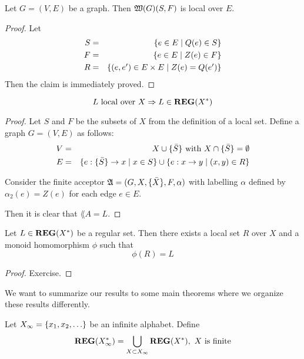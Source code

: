 \bigskip
\begin{lemma}
Let $G = (V, E)$ be a graph. Then $\mbox{$\mathfrak{W}({G})$}(S, F)$ is local over $E$.
\end{lemma}

\begin{proof}
Let \begin{eqnarray*}
S & = & \mbox{$\{e \in E \mid Q(e) \in S\}$} \\ 
F & = & \mbox{$\{e \in E \mid Z(e) \in F\}$} \\
R & = & \mbox{$\{(e, e') \in E \times E \mid Z(e) = Q(e')\}$} 
\end{eqnarray*}
Then the claim is immediately proved.
\end{proof}

\bigskip
\begin{lemma}
\[ L \mbox{ local over } X \Rightarrow L \in \mbox{{\bf REG}}(X^*) \]
\end{lemma}

\begin{proof}
Let $S$ and $F$ be the subsets of $X$ from the definition of a local
set. Define a graph $G = (V, E)$ as follows:
\begin{eqnarray*}
V & = & X \cup \mbox{$\{\bar{S}\}$} \mbox{ with } X \cap \mbox{$\{\bar{S}\}$} = \emptyset
\\
E & = & \mbox{$\{e : \mbox{$\{\bar{S}\}$} \to x \mid x \in S\}$} \cup \mbox{$\{e : x \to y
\mid (x, y) \in R\}$}
\end{eqnarray*}

Consider the finite acceptor $\mbox{$\mathfrak{A}$} = (G, X, \mbox{$\{\bar{X}\}$}, F, \alpha)$ with
labelling $\alpha$ defined by $\alpha_2(e) = Z(e)$ for each edge $e \in E$.

Then it is clear that $\lang{A} = L$.
\end{proof}

\bigskip
\begin{lemma}
Let $L \in \mbox{{\bf REG}}(X^*)$ be a regular set. Then there exists a local set
$R$ over $X$ and a monoid homomorphism $\phi$ such that \[ \phi(R) = L \]
\end{lemma}

\begin{proof}
Exercise.
\end{proof}

\bigskip
We want to summarize our results to some main theorems where we organize these
results differently.

Let $X_\infty = \mbox{$\{x_1, x_2, \ldots\}$}$ be an infinite alphabet. Define 
\[ \mbox{{\bf REG}}(X_\infty^*) = \bigcup_{X \subset X_\infty} \mbox{{\bf REG}}(X^*),\ X
	\text{ is finite} \]

